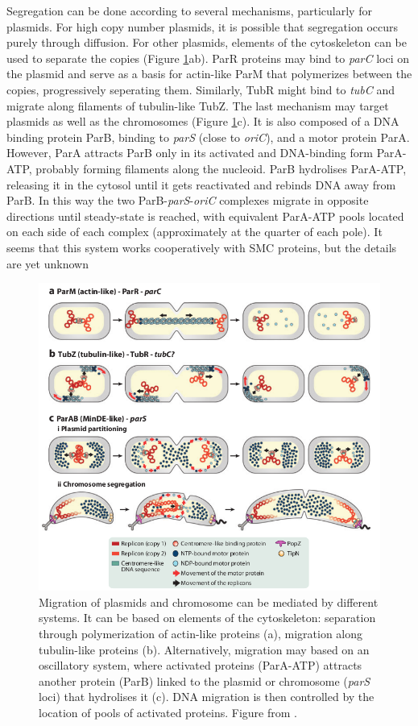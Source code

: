 Segregation can be done according to several mechanisms, particularly for plasmids. For high copy number plasmids, it is possible that segregation occurs purely through diffusion. For other plasmids, elements of the cytoskeleton can be used to separate the copies (Figure \ref{fig:dnaMigration}ab). ParR proteins may bind to \textit{parC} loci on the plasmid and serve as a basis for actin-like ParM that polymerizes between the copies, progressively seperating them. Similarly, TubR might bind to \textit{tubC} and migrate along filaments of tubulin-like TubZ. The last mechanism may target plasmids as well as the chromosomes (Figure \ref{fig:dnaMigration}c). It is also composed of a DNA binding protein ParB, binding to \textit{parS} (close to \textit{oriC}), and a motor protein ParA. However, ParA attracts ParB only in its activated and DNA-binding form ParA-ATP, probably forming filaments along the nucleoid. ParB hydrolises ParA-ATP, releasing it in the cytosol until it gets reactivated and rebinds DNA away from ParB. In this way the two ParB-\textit{parS}-\textit{oriC} complexes migrate in opposite directions until steady-state is reached, with equivalent ParA-ATP pools located on each side of each complex (approximately at the quarter of each pole). It seems that this system works cooperatively with SMC proteins, but the details are yet unknown \citep{reyes-lamothe_chromosome_2012} 
\begin{figure}[!ht]
	\centering
	\includegraphics[width=0.8\linewidth]{figure/DNAmigration}
	\caption{Migration of plasmids and chromosome can be mediated by different systems. It can be based on elements of the cytoskeleton: separation through polymerization of actin-like proteins (a), migration along tubulin-like proteins (b). Alternatively, migration may based on an oscillatory system, where activated proteins (ParA-ATP) attracts another protein (ParB) linked to the plasmid or chromosome (\textit{parS} loci) that hydrolises it (c). DNA migration is then controlled by the location of pools of activated proteins. Figure from \citet{reyes-lamothe_chromosome_2012}.}
	\label{fig:dnaMigration}
\end{figure}

